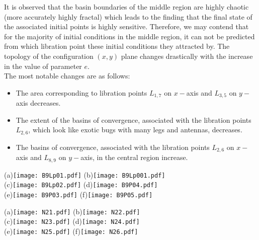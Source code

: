 \documentclass[preprint,fleqn,5p,numbers,sort&compress]{elsarticle}
\begin{document}
It is observed that the basin boundaries of the middle region are highly chaotic (more accurately highly fractal) which leads to the finding that the final state of the associated initial points is highly sensitive. Therefore, we may contend that for the majority of initial conditions in the middle region, it can not be predicted from which libration point these initial conditions they attracted by. The topology of the configuration $(x, y)$ plane changes drastically with the increase in the value of parameter $e$.\\
The most notable changes are as follows:
\begin{itemize}
  \item The area corresponding to libration points $L_{1,7}$  on $x-$axis and $L_{3,5}$ on $y-$axis decreases.
  \item The extent of the basins of convergence, associated with the libration points $L_{2,6}$, which look like exotic bugs with many legs and antennas, decreases.
  \item The basins of convergence, associated with the libration points $L_{2, 6}$ on $x-$axis and $L_{8, 9}$ on $y-$axis, in the central region increase.
\end{itemize}
\begin{figure*}\label{Fig:5}
\begin{center}
(a)\texttt{[image: B9Lp01.pdf]}%
(b)\texttt{[image: B9Lp001.pdf]}\\%
(c)\texttt{[image: B9Lp02.pdf]}%
(d)\texttt{[image: B9P04.pdf]}\\%
(e)\texttt{[image: B9P03.pdf]}%
(f)\texttt{[image: B9P05.pdf]}%
\caption{The Newton-Raphson basins of attraction on the $xy$-plane for the case when nine libration points exist for:  (a) $e=-0.499$;  (b) $e=-0.485$; (c) $e=-0.4757$; (d) $e=-0.457$; (e) $e=-0.4$;  (f) $e=-0.275$. The color code denoting the attractors is as follows: $L_1$ (\emph{yellow}); $L_2$ (\emph{Darker blue}); $L_4$ (\emph{green}); $L_{6}$ (\emph{blue}); $L_{7}$ (\emph{cyan}); $L_{8}$ (\emph{purple}); $L_{9}$ (\emph{crimson}); $L_{10}$(\emph{teal}); $L_{11}$(\emph{magenta}) and non-converging points (\emph{white}). The black dots show the position of the libration points.}
\end{center}
\end{figure*}
\begin{figure*}\label{Fig:6}
\begin{center}
(a)\texttt{[image: N21.pdf]}%
(b)\texttt{[image: N22.pdf]}\\%
(c)\texttt{[image: N23.pdf]}%
(d)\texttt{[image: N24.pdf]}\\%
(e)\texttt{[image: N25.pdf]}%
(f)\texttt{[image: N26.pdf]}%
\caption{The corresponding distributions of the number $N$ of the required iterations for obtaining the Newton-Raphson basins of convergence,
shown in Fig. 4(a-f). (Color figure online).}
\end{center}
\end{figure*}
\end{document}
